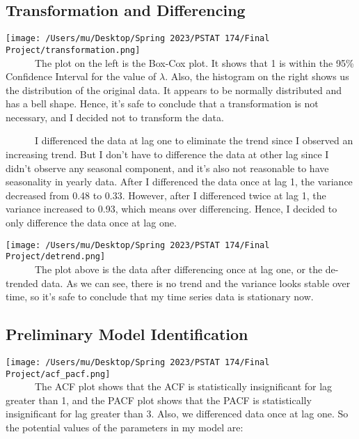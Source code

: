 \documentclass[
]{article}
\begin{document}
\hypertarget{transformation-and-differencing}{%
\subsection{Transformation and
Differencing}\label{transformation-and-differencing}}

\texttt{[image: /Users/mu/Desktop/Spring 2023/PSTAT 174/Final Project/transformation.png]}\\

~~~~~~The plot on the left is the Box-Cox plot. It shows that 1 is
within the 95\% Confidence Interval for the value of \(\lambda\). Also,
the histogram on the right shows us the distribution of the original
data. It appears to be normally distributed and has a bell shape. Hence,
it's safe to conclude that a transformation is not necessary, and I
decided not to transform the data.

~~~~~~I differenced the data at lag one to eliminate the trend since I
observed an increasing trend. But I don't have to difference the data at
other lag since I didn't observe any seasonal component, and it's also
not reasonable to have seasonality in yearly data. After I differenced
the data once at lag 1, the variance decreased from 0.48 to 0.33.
However, after I differenced twice at lag 1, the variance increased to
0.93, which means over differencing. Hence, I decided to only difference
the data once at lag one.

\texttt{[image: /Users/mu/Desktop/Spring 2023/PSTAT 174/Final Project/detrend.png]}\\

~~~~~~The plot above is the data after differencing once at lag one, or
the de-trended data. As we can see, there is no trend and the variance
looks stable over time, so it's safe to conclude that my time series
data is stationary now.

\hypertarget{preliminary-model-identification}{%
\subsection{Preliminary Model
Identification}\label{preliminary-model-identification}}

\texttt{[image: /Users/mu/Desktop/Spring 2023/PSTAT 174/Final Project/acf\_pacf.png]}\\

~~~~~~The ACF plot shows that the ACF is statistically insignificant for
lag greater than 1, and the PACF plot shows that the PACF is
statistically insignificant for lag greater than 3. Also, we differenced
data once at lag one. So the potential values of the parameters in my
model are:
\end{document}
